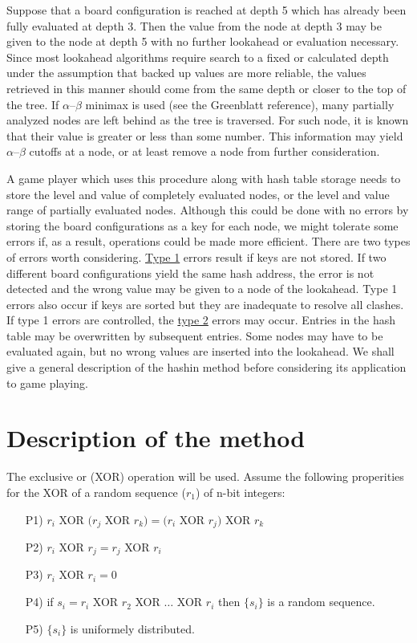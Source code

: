 \documentclass{article}
\begin{document}
Suppose that a board configuration is reached at depth 5 which has already been
fully evaluated at depth 3. Then the value from the node at depth 3 may be
given to the node at depth 5 with no further lookahead or evaluation
necessary. Since most lookahead algorithms require search to a fixed or
calculated depth under the assumption that backed up values are more reliable,
the values retrieved in this manner should come from the same depth or closer
to the top of the tree. If $\alpha$--$\beta$ minimax is used (see the Greenblatt
reference), many partially analyzed nodes are left behind as the tree is
traversed. For such node, it is known that their value is greater or less than
some number. This information may yield $\alpha$--$\beta$ cutoffs at a node, or at
least remove a node from further consideration.

A game player which uses this procedure along with hash table storage needs to
store the level and value of completely evaluated nodes, or the level and value
range of partially evaluated nodes. Although this could be done with no errors
by storing the board configurations as a key for each node, we might tolerate
some errors if, as a result, operations could be made more efficient. There are
two types of errors worth considering. \underline{Type 1} errors result if keys
are not stored. If two different board configurations yield the same hash
address, the error is not detected and the wrong value may be given to a node
of the lookahead. Type 1 errors also occur if keys are sorted but they are
inadequate to resolve all clashes. If type 1 errors are controlled, the
\underline{type 2} errors may occur. Entries in the hash table may be
overwritten by subsequent entries. Some nodes may have to be evaluated again,
but no wrong values are inserted into the lookahead. We shall give a general
description of the hashin method before considering its application to game
playing.

\section*{Description of the method}

The exclusive or (XOR) operation will be used. Assume the following properities
for the XOR of a random sequence ($r_1$) of n-bit integers:

\begin{itemize}
\item[P1)] $r_i$ XOR $(r_j$ XOR $r_k) = (r_i$ XOR $r_j)$ XOR $r_k$
\item[P2)] $r_i$ XOR $r_j = r_j$ XOR $r_i$
\item[P3)] $r_i$ XOR $r_i = 0$
\item[P4)] if $s_i = r_i$ XOR $r_2$ XOR $\ldots$ XOR $r_i$ then $\{s_i\}$ is a random sequence.
\item[P5)] $\{s_i\}$ is uniformely distributed.
\end{itemize}
\end{document}
